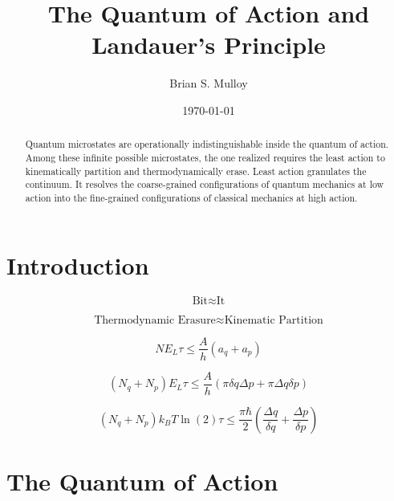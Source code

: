 \documentclass[%
  aps, reprint, prl, amsmath,amssymb
]{revtex4-2}
\begin{document}
\title{The Quantum of Action and Landauer's Principle}

\begin{abstract}
Quantum microstates are operationally indistinguishable inside the quantum of action. Among these infinite possible microstates, the one realized requires the least action to kinematically partition and thermodynamically erase. Least action granulates the continuum. It resolves the coarse-grained configurations of quantum mechanics at low action into the fine-grained configurations of classical mechanics at high action.
\end{abstract}

\author{Brian S. Mulloy}

\date{\today}

\maketitle

\section{Introduction}
\begin{equation}
\label{eq:MainIdeaTextWheeler}
\text{Bit} \approx \text{It}
\end{equation}

\begin{equation}
\label{eq:MainIdeaText}
\text{Thermodynamic Erasure} \approx \text{Kinematic Partition}
\end{equation}

\begin{equation}
\label{eq:Hero}
N E_L \tau \le \frac{A}{h}(a_q + a_p)
\end{equation}

\begin{equation}
\label{eq:2DHero}
(N_q + N_p) E_L \tau \le \frac{A}{h}(\pi \delta q \Delta p + \pi \Delta q \delta p)
\end{equation}

\begin{equation}
\label{eq:FullyExpandedHero}
(N_q + N_p) k_B T \ln(2) \tau \le \frac{\pi \hbar}{2} \left( \frac{\Delta q}{\delta q} + \frac{\Delta p}{\delta p} \right)
\end{equation}

\section{The Quantum of Action}
\end{document}
